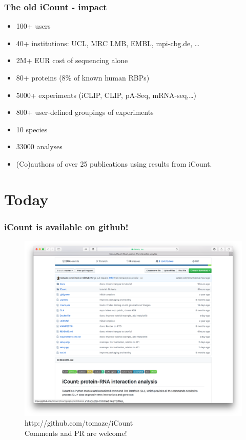 \documentclass{beamer}
\begin{document}
\begin{frame}
\frametitle{The old iCount - impact}

\begin{itemize}
\item 100+ users
\item 40+ institutions: UCL, MRC LMB, EMBL, mpi-cbg.de, …
\item 2M+ EUR cost of sequencing alone
\item 80+ proteins (8\% of known human RBPs)
\item 5000+ experiments (iCLIP, CLIP, pA-Seq, mRNA-seq,…)
\item 800+ user-defined groupings of experiments
\item 10 species
\item 33000 analyses

\item (Co)authors of over 25 publications using results from iCount.
\end{itemize}

\end{frame}


\section{Today}
\begin{frame}
\frametitle{iCount is available on github!}

\begin{figure}
\begin{center}
    \includegraphics[width=0.6\linewidth]{images/github.png}
    \caption{http://github.com/tomazc/iCount\\
    Comments and PR are welcome!}
\end{center}
\end{figure}

\end{frame}
\end{document}

